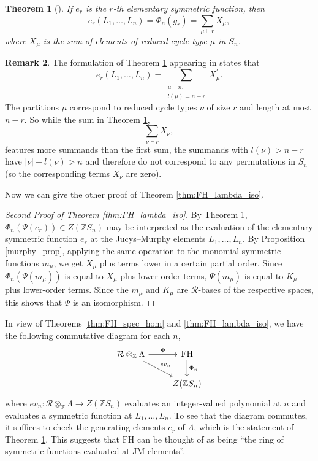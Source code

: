 \documentclass[10pt]{article}
\newtheorem{theorem}{Theorem}[section]
\theoremstyle{definition}
\newtheorem{remark}[theorem]{Remark}
\newcommand{\FH}{\mathrm{FH}}
\begin{document}
\begin{theorem}[{\cite[Section 3]{Jucys}}] \label{thm:elem_JM}
If $e_r$ is the $r$-th elementary symmetric function, then
\[
e_r(L_1, \ldots, L_n) = \Phi_n(g_r) = \sum_{\mu \vdash r} X_\mu,
\]
where $X_\mu$ is the sum of elements of reduced cycle type $\mu$ in $S_n$.
\end{theorem}

\begin{remark}
The formulation of Theorem \ref{thm:elem_JM} appearing in \cite[Section 3]{Jucys} states that 
\[
e_r(L_1, \ldots, L_n) = \sum_{\substack{\mu \vdash n, \\ l(\mu) = n-r}} X_\mu^\prime.
\]
The partitions $\mu$ correspond to reduced cycle types $\nu$ of size $r$ and length at most $n-r$. So while the sum in Theorem \ref{thm:elem_JM},
\[
\sum_{\nu \vdash r} X_{\nu},
\]
features more summands than the first sum, the summands with $l(\nu) > n-r$ have $|\nu| + l(\nu) > n$ and therefore do not correspond to any permutations in $S_n$ (so the corresponding terms $X_{\nu}$ are zero).
\end{remark}


Now we can give the other proof of Theorem \ref{thm:FH_lambda_iso}.
\begin{proof}[Second Proof of Theorem \ref{thm:FH_lambda_iso}]
By Theorem \ref{thm:elem_JM}, $\Phi_n(\Psi(e_r)) \in Z(\mathbb{Z}S_n)$ may be interpreted as the evaluation of the elementary symmetric function $e_r$ at the Jucys--Murphy elements $L_1, \ldots, L_n$. By Proposition \ref{murphy_prop}, applying the same operation to the monomial symmetric functions $m_\mu$, we get $X_\mu$ plus terms lower in a certain partial order. Since $\Phi_n(\Psi(m_\mu))$ is equal to $X_\mu$ plus lower-order terms, $\Psi(m_\mu)$ is equal to $K_\mu$ plus lower-order terms. Since the $m_\mu$ and $K_\mu$ are $\mathcal{R}$-bases of the respective spaces, this shows that $\Psi$ is an isomorphism.
\end{proof}

In view of Theorems \ref{thm:FH_spec_hom} and \ref{thm:FH_lambda_iso}, we have the following commutative diagram for each $n$,
\begin{equation}
\begin{tikzcd}
\mathcal{R} \otimes_{\mathbb{Z}} \Lambda    \arrow[r, "\Psi"]    \arrow[dr, "ev_n"]    &    \FH    \arrow[d, "\Phi_n"]\\
&    Z(\mathbb{Z}S_n)
\end{tikzcd}
\end{equation}
where $ev_n: \mathcal{R} \otimes_{\mathbb{Z}} \Lambda \to Z(\mathbb{Z}S_n)$ evaluates an integer-valued polynomial at $n$ and evaluates a symmetric function at $L_1, \ldots, L_n$. To see that the diagram commutes, it suffices to check the generating elements $e_r$ of $\Lambda$, which is the statement of Theorem \ref{thm:elem_JM}. This suggests that $\FH$ can be thought of as being ``the ring of symmetric functions evaluated at JM elements''.
\end{document}
